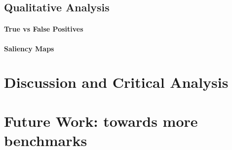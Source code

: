 \begin{figure}[htb!]
	\scalebox{0.8}{}
	\caption{}
	\label{fig:detection_experiment_2}
\end{figure}



\begin{figure}[htb!]
	\scalebox{0.8}{}
	\caption{}
	\label{fig:detection_experiment_3}
\end{figure}


\begin{figure}[htb!]
	\scalebox{0.8}{}
	\caption{}
	\label{fig:detection_experiment_4}
\end{figure}




\subsection{Qualitative Analysis}
\paragraph{True vs False Positives}
\paragraph{Saliency Maps}


\section{Discussion and Critical Analysis}
\label{sec:discussion}


\section{Future Work: towards more benchmarks}
\label{sec:future_work}
